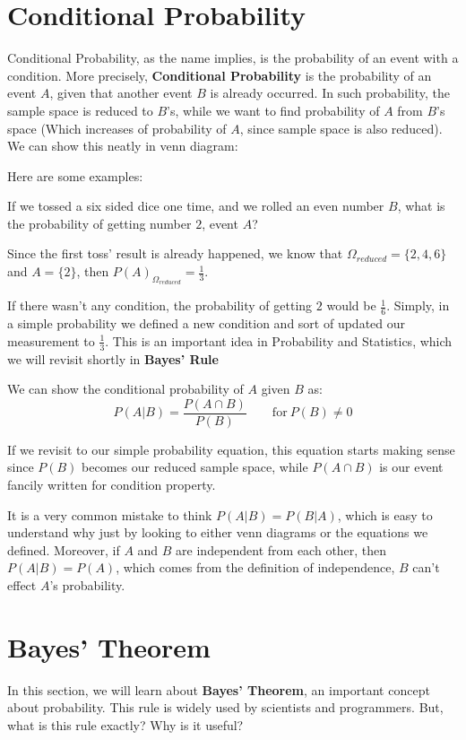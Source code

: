 \section{Conditional Probability}
Conditional Probability, as the name implies, is the probability of an event with a condition. More precisely, \textbf{Conditional Probability}  is the probability of an event $A$, given that another event $B$ is already occurred. In such probability, the sample space is reduced to $B$'s, while we want to find probability of $A$ from $B$'s space (Which increases of probability of $A$, since sample space is also reduced). We can show this neatly in venn diagram:


\par 
Here are some examples:
\begin{example}
    If we tossed a six sided dice one time, and we rolled an even number $B$, what is the probability of getting number $2$, event $A$?
\end{example}
Since the first toss' result is already happened, we know that  $\Omega_{reduced}=\{2,4,6\}$ and  $A = \{2\}$, then $P(A)_{\Omega_{reduced}}=\frac{1}{3}$. 

If there wasn't any condition, the probability of getting $2$ would be $\frac{1}{6}$. Simply, in a simple probability we defined a new condition and sort of updated our measurement to $\frac{1}{3}$. This is an important idea in Probability and Statistics, which we will revisit shortly in \textbf{Bayes' Rule}
\par 
We can show the conditional probability of $A$ given $B$ as:
$$ P(A | B) = \frac{P(A \cap B)}{P(B)} \qquad \text{for}\ P(B) \neq 0$$
\par
If we revisit to our simple probability equation, this equation starts making sense since $P(B)$ becomes our reduced sample space, while $P(A \cap B)$ is our event fancily written for condition property.

It is a very common mistake to think $P( A | B) = P(B | A)$, which is easy to understand why just by looking to either venn diagrams or the equations we defined. Moreover, if $A$ and $B$ are independent from each other, then $P(A|B)= P(A)$, which comes from the definition of independence, $B$ can't effect $A$'s probability.

\section{Bayes' Theorem}

In this section, we will learn about \textbf{Bayes' Theorem}, an important concept about probability. This rule is widely used by scientists and programmers. But, what is this rule exactly? Why is it useful?

